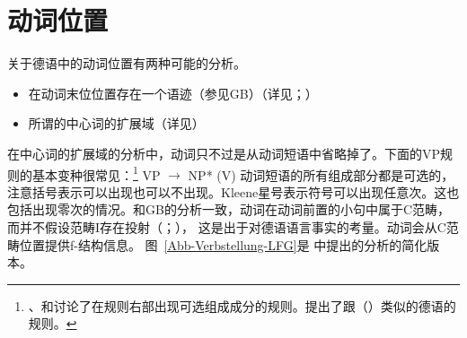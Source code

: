 \section{动词位置}
\label{Abschnitt-Verbstellung-LFG}

关于德语中的动词位置有两种可能的分析。
\begin{sloppypar}
\begin{itemize}
\item 在动词末位位置存在一个语迹（参见GB\indexgbc）（详见\citealp{Choi99a-u}；\citealp[\S~2.1.4]{Berman96a-u}） 
\item 所谓的中心词的扩展域（详见\citealp{Berman2003a}）
\end{itemize}
\end{sloppypar}

在中心词的扩展域的分析中，动词只不过是从动词短语中省略掉了。下面的VP规则的基本变种很常见：\footnote{%
 、\citet[]{ZK2002a}和讨论了在规则右部出现可选组成成分的规则。\citet[]{ZK2002a}提出了跟（）类似的德语的规则。%
}
\ea
\label{Regel-LFG-VP-alles-optional}
VP $\to$ NP* (V)
\z
动词短语的所有组成部分都是可选的，注意括号表示可以出现也可以不出现。Kleene星号\isc{*}\is{*}表示符号可以出现任意次。这也包括出现零次的情况。和GB的分析一致，动词在动词前置的小句中属于C范畴，而并不假设范畴I存在投射（\citealp{Haider93a,Haider95b-u,Haider97a}；\citealp[\S~IV.3]{Sternefeld2006a-u}），
这是出于对德语语言事实的考量\citep[\S~3.2.2]{Berman2003a}。动词会从C范畴位置提供f-结构信息。
图~\vref{Abb-Verbstellung-LFG}是 \citet[]{Berman2003a}中提出的分析的简化版本。
 
